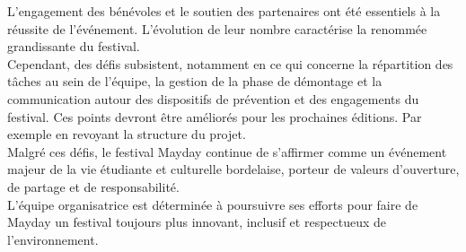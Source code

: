 \documentclass[12pt,a4paper]{report}
\begin{document}
L’engagement des bénévoles et le soutien des partenaires ont été essentiels à la réussite de l’événement. L'évolution de leur nombre caractérise la renommée grandissante du festival.\\ 

Cependant, des défis subsistent, notamment en ce qui concerne la répartition des tâches au sein de l’équipe, la gestion de la phase de démontage et la communication autour des dispositifs de prévention et des engagements du festival. Ces points devront être améliorés pour les prochaines éditions. Par exemple en revoyant la structure du projet.\\

Malgré ces défis, le festival Mayday continue de s’affirmer comme un événement majeur de la vie étudiante et culturelle bordelaise, porteur de valeurs d’ouverture, de partage et de responsabilité.\\

L’équipe organisatrice est déterminée à poursuivre ses efforts pour faire de Mayday un festival toujours plus innovant, inclusif et respectueux de l’environnement.

\listoftables
\end{document}
